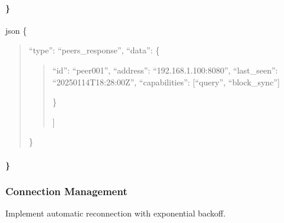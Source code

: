 \documentclass[letterpaper,10pt,english]{sphinxmanual}
\begin{document}
\paragraph{\}}
\label{\detokenize{api/websocket-api:id110}}
\sphinxAtStartPar
{}
{\color{red}\bfseries{}\textasciigrave{}\textasciigrave{}}{\color{red}\bfseries{}\textasciigrave{}}json
\{
\begin{quote}

\sphinxAtStartPar
“type”: “peers\_response”,
“data”: \{
\begin{quote}
\begin{description}
\sphinxlineitem{“connected\_peers”: {[}}\begin{description}
\sphinxlineitem{\{}
\sphinxAtStartPar
“id”: “peer\sphinxhyphen{}001”,
“address”: “192.168.1.100:8080”,
“last\_seen”: “2025\sphinxhyphen{}01\sphinxhyphen{}14T18:28:00Z”,
“capabilities”: {[}“query”, “block\_sync”{]}

\end{description}

\sphinxAtStartPar
\}

\end{description}

\sphinxAtStartPar
{]}
\end{quote}

\sphinxAtStartPar
\}
\end{quote}


\paragraph{\}}
\label{\detokenize{api/websocket-api:id115}}

\subsubsection{Connection Management}
\label{\detokenize{api/websocket-api:connection-management}}
\sphinxAtStartPar
Implement automatic reconnection with exponential backoff.
\end{document}
